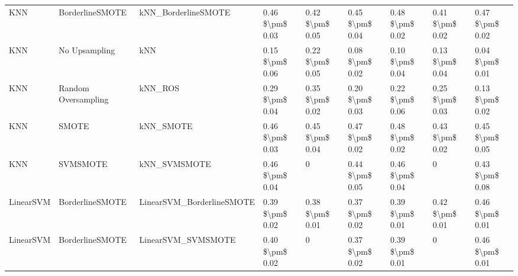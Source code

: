\begin{tabular}{lllllllll}
                            KNN &               BorderlineSMOTE &                          kNN\_BorderlineSMOTE & 0.46 \$\textbackslash pm\$ 0.03 &           0.42 \$\textbackslash pm\$ 0.05 &       0.45 \$\textbackslash pm\$ 0.04 &        0.48 \$\textbackslash pm\$ 0.02 &                         0.41 \$\textbackslash pm\$ 0.02 &     0.47 \$\textbackslash pm\$ 0.02 \\
                            KNN &                 No Upsampling &                                          kNN & 0.15 \$\textbackslash pm\$ 0.06 &           0.22 \$\textbackslash pm\$ 0.05 &       0.08 \$\textbackslash pm\$ 0.02 &        0.10 \$\textbackslash pm\$ 0.04 &                         0.13 \$\textbackslash pm\$ 0.04 &     0.04 \$\textbackslash pm\$ 0.01 \\
                            KNN &           Random Oversampling &                                      kNN\_ROS & 0.29 \$\textbackslash pm\$ 0.04 &           0.35 \$\textbackslash pm\$ 0.02 &       0.20 \$\textbackslash pm\$ 0.03 &        0.22 \$\textbackslash pm\$ 0.06 &                         0.25 \$\textbackslash pm\$ 0.03 &     0.13 \$\textbackslash pm\$ 0.02 \\
                            KNN &                         SMOTE &                                    kNN\_SMOTE & 0.46 \$\textbackslash pm\$ 0.03 &           0.45 \$\textbackslash pm\$ 0.04 &       0.47 \$\textbackslash pm\$ 0.02 &        0.48 \$\textbackslash pm\$ 0.02 &                         0.43 \$\textbackslash pm\$ 0.02 &     0.45 \$\textbackslash pm\$ 0.05 \\
                            KNN &                      SVMSMOTE &                                 kNN\_SVMSMOTE & 0.46 \$\textbackslash pm\$ 0.04 &                         0 &       0.44 \$\textbackslash pm\$ 0.05 &        0.46 \$\textbackslash pm\$ 0.04 &                                       0 &     0.43 \$\textbackslash pm\$ 0.08 \\
                      LinearSVM &               BorderlineSMOTE &                    LinearSVM\_BorderlineSMOTE & 0.39 \$\textbackslash pm\$ 0.02 &           0.38 \$\textbackslash pm\$ 0.01 &       0.37 \$\textbackslash pm\$ 0.02 &        0.39 \$\textbackslash pm\$ 0.01 &                         0.42 \$\textbackslash pm\$ 0.01 &     0.46 \$\textbackslash pm\$ 0.01 \\
                      LinearSVM &               BorderlineSMOTE &                           LinearSVM\_SVMSMOTE & 0.40 \$\textbackslash pm\$ 0.02 &                         0 &       0.37 \$\textbackslash pm\$ 0.02 &        0.39 \$\textbackslash pm\$ 0.01 &                                       0 &     0.46 \$\textbackslash pm\$ 0.01 \\

\end{tabular}
